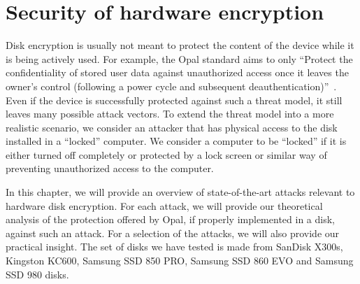 \newcommand{\REPLACEME}{\subsection*{Impact on Opal devices}}

\chapter{Security of hardware encryption}
\label{chapter:security}

Disk encryption is usually not meant to protect the content of the device while it is being actively used.
For example, the Opal standard aims to only \enquote{Protect the confidentiality of stored user data against unauthorized access once it leaves the owner's control (following a power cycle and subsequent deauthentication)}~\cite{tcg-opal2}.
Even if the device is successfully protected against such a threat model, it still leaves many possible attack vectors.
To extend the threat model into a more realistic scenario, we consider an attacker that has physical access to the disk installed in a ``locked'' computer. We consider a computer to be ``locked'' if it is either turned off completely or protected by a lock screen or similar way of preventing unauthorized access to the computer.







In this chapter, we will provide an overview of state-of-the-art attacks relevant to hardware disk encryption. For each attack, we will provide our theoretical analysis of the protection offered by Opal, if properly implemented in a disk, against such an attack. For a selection of the attacks, we will also provide our practical insight. The set of disks we have tested is made from SanDisk X300s, Kingston KC600, Samsung SSD 850 PRO, Samsung SSD 860 EVO and Samsung SSD 980 disks.

